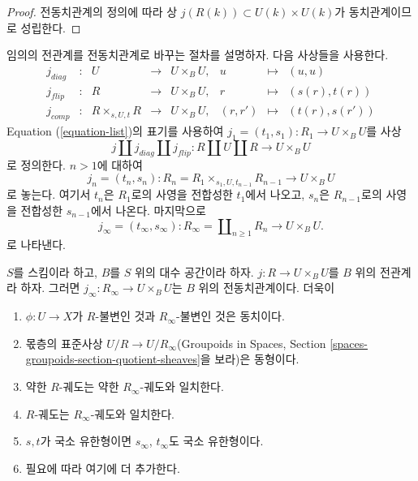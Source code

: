 \begin{proof}
전동치관계의 정의에 따라 상
$j(R(k)) \subset U(k) \times U(k)$가 동치관계이므로 성립한다.
\end{proof}

\noindent
임의의 전관계를 전동치관계로 바꾸는 절차를 설명하자. 다음 사상들을 사용한다.
\begin{equation}
\label{equation-list}
\begin{matrix}
j_{diag} &
: &
U &
\longrightarrow &
U \times_B U, &
u &
\longmapsto &
(u, u) \\
j_{flip} &
: &
R &
\longrightarrow &
U \times_B U, &
r &
\longmapsto &
(s(r), t(r)) \\
j_{comp} &
: &
R \times_{s, U, t} R &
\longrightarrow &
U \times_B U, &
(r, r') &
\longmapsto &
(t(r), s(r'))
\end{matrix}
\end{equation}
Equation (\ref{equation-list})의 표기를 사용하여
$j_1 = (t_1, s_1) : R_1 \to U \times_B U$를 사상
$$
j \amalg j_{diag} \amalg j_{flip} :
R \amalg U \amalg R
\longrightarrow
U \times_B U
$$
로 정의한다. $n > 1$에 대하여
$$
j_n = (t_n, s_n) :
R_n = R_1 \times_{s_1, U, t_{n - 1}} R_{n - 1} \longrightarrow U \times_B U
$$
로 놓는다. 여기서 $t_n$은 $R_1$로의 사영을 전합성한 $t_1$에서 나오고,
$s_n$은 $R_{n - 1}$로의 사영을 전합성한 $s_{n - 1}$에서 나온다.
마지막으로
$$
j_\infty = (t_\infty, s_\infty) :
R_\infty = \coprod\nolimits_{n \geq 1} R_n
\longrightarrow
U \times_B U.
$$
로 나타낸다.

\begin{lemma}
\label{lemma-make-pre-equivalence}
$S$를 스킴이라 하고, $B$를 $S$ 위의 대수 공간이라 하자.
$j : R \to U \times_B U$를 $B$ 위의 전관계라 하자.
그러면 $j_\infty : R_\infty \to U \times_B U$는
$B$ 위의 전동치관계이다. 더욱이
\begin{enumerate}
\item $\phi : U \to X$가 $R$-불변인 것과 $R_\infty$-불변인 것은 동치이다.
\item 몫층의 표준사상 $U/R \to U/R_\infty$(Groupoids in Spaces,
Section \ref{spaces-groupoids-section-quotient-sheaves}을 보라)은 동형이다.
\item 약한 $R$-궤도는 약한 $R_\infty$-궤도와 일치한다.
\item $R$-궤도는 $R_\infty$-궤도와 일치한다.
\item $s, t$가 국소 유한형이면 $s_\infty$, $t_\infty$도 국소 유한형이다.
\item 필요에 따라 여기에 더 추가한다.
\end{enumerate}
\end{lemma}

